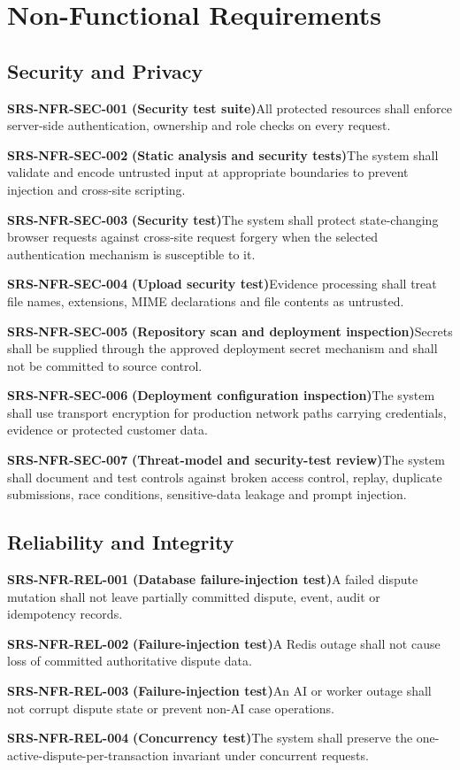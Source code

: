 \documentclass[11pt,a4paper]{article}
\newcommand{\req}[3]{%
    \par\noindent\textbf{\color{ADGBlue}#1}\quad
    \textbf{(#3)}\enspace #2\par\smallskip
}
\begin{document}
\section{Non-Functional Requirements}

\subsection{Security and Privacy}

\req{SRS-NFR-SEC-001}{All protected resources shall enforce server-side authentication, ownership and role checks on every request.}{Security test suite}
\req{SRS-NFR-SEC-002}{The system shall validate and encode untrusted input at appropriate boundaries to prevent injection and cross-site scripting.}{Static analysis and security tests}
\req{SRS-NFR-SEC-003}{The system shall protect state-changing browser requests against cross-site request forgery when the selected authentication mechanism is susceptible to it.}{Security test}
\req{SRS-NFR-SEC-004}{Evidence processing shall treat file names, extensions, MIME declarations and file contents as untrusted.}{Upload security test}
\req{SRS-NFR-SEC-005}{Secrets shall be supplied through the approved deployment secret mechanism and shall not be committed to source control.}{Repository scan and deployment inspection}
\req{SRS-NFR-SEC-006}{The system shall use transport encryption for production network paths carrying credentials, evidence or protected customer data.}{Deployment configuration inspection}
\req{SRS-NFR-SEC-007}{The system shall document and test controls against broken access control, replay, duplicate submissions, race conditions, sensitive-data leakage and prompt injection.}{Threat-model and security-test review}

\subsection{Reliability and Integrity}

\req{SRS-NFR-REL-001}{A failed dispute mutation shall not leave partially committed dispute, event, audit or idempotency records.}{Database failure-injection test}
\req{SRS-NFR-REL-002}{A Redis outage shall not cause loss of committed authoritative dispute data.}{Failure-injection test}
\req{SRS-NFR-REL-003}{An AI or worker outage shall not corrupt dispute state or prevent non-AI case operations.}{Failure-injection test}
\req{SRS-NFR-REL-004}{The system shall preserve the one-active-dispute-per-transaction invariant under concurrent requests.}{Concurrency test}
\end{document}
